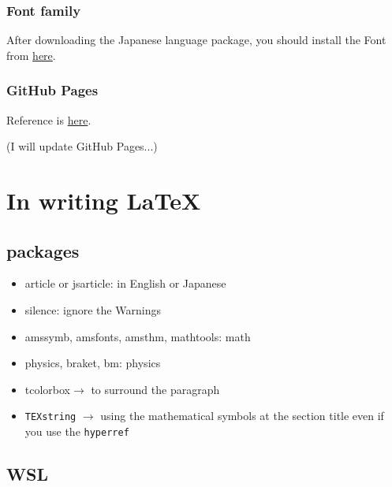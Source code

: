 \documentclass[a4paper,pdftex]{article}
\begin{document}
\subsubsection{Font family}

After downloading the Japanese language package, you should install the Font from \href{https://github.com/mzyy94/RictyDiminished-for-Powerline}{here}. 

\subsubsection{GitHub Pages}

Reference is \href{https://miya-system-works.com/blog/detail/vscode-github/}{here}.

(I will update GitHub Pages...)





\section{In writing \LaTeX}

\subsection{packages}

\begin{itemize}
  \item 
  article or jsarticle: in English or Japanese

  \item 
  silence: ignore the Warnings

  \item 
  amssymb, amsfonts, amsthm, mathtools: math

  \item 
  physics, braket, bm: physics

  \item 
  tcolorbox$\rightarrow$ to surround the paragraph

  \item 
  \texttt{\texorpdfstring{TEXstring}{PDFstring}}
  $\rightarrow$
  using the mathematical symbols at the section title even if you use the \texttt{hyperref}

\end{itemize}

\subsection{WSL}
\end{document}
